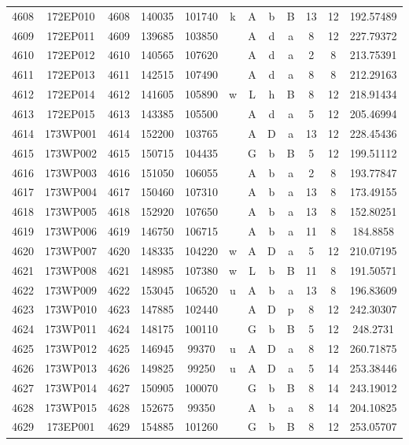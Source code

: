 \begin{tabular}{|*{12}{c|}}
4608 & 172EP010 & 4608 & 140035 & 101740 & k & A & b & B & 13 & 12 & 192.57489 \\ 
4609 & 172EP011 & 4609 & 139685 & 103850 &  & A & d & a & 8 & 12 & 227.79372 \\ 
4610 & 172EP012 & 4610 & 140565 & 107620 &  & A & d & a & 2 & 8 & 213.75391 \\ 
4611 & 172EP013 & 4611 & 142515 & 107490 &  & A & d & a & 8 & 8 & 212.29163 \\ 
4612 & 172EP014 & 4612 & 141605 & 105890 & w & L & h & B & 8 & 12 & 218.91434 \\ 
4613 & 172EP015 & 4613 & 143385 & 105500 &  & A & d & a & 5 & 12 & 205.46994 \\ 
4614 & 173WP001 & 4614 & 152200 & 103765 &  & A & D & a & 13 & 12 & 228.45436 \\ 
4615 & 173WP002 & 4615 & 150715 & 104435 &  & G & b & B & 5 & 12 & 199.51112 \\ 
4616 & 173WP003 & 4616 & 151050 & 106055 &  & A & b & a & 2 & 8 & 193.77847 \\ 
4617 & 173WP004 & 4617 & 150460 & 107310 &  & A & b & a & 13 & 8 & 173.49155 \\ 
4618 & 173WP005 & 4618 & 152920 & 107650 &  & A & b & a & 13 & 8 & 152.80251 \\ 
4619 & 173WP006 & 4619 & 146750 & 106715 &  & A & b & a & 11 & 8 & 184.8858 \\ 
4620 & 173WP007 & 4620 & 148335 & 104220 & w & A & D & a & 5 & 12 & 210.07195 \\ 
4621 & 173WP008 & 4621 & 148985 & 107380 & w & L & b & B & 11 & 8 & 191.50571 \\ 
4622 & 173WP009 & 4622 & 153045 & 106520 & u & A & b & a & 13 & 8 & 196.83609 \\ 
4623 & 173WP010 & 4623 & 147885 & 102440 &  & A & D & p & 8 & 12 & 242.30307 \\ 
4624 & 173WP011 & 4624 & 148175 & 100110 &  & G & b & B & 5 & 12 & 248.2731 \\ 
4625 & 173WP012 & 4625 & 146945 & 99370 & u & A & D & a & 8 & 12 & 260.71875 \\ 
4626 & 173WP013 & 4626 & 149825 & 99250 & u & A & D & a & 5 & 14 & 253.38446 \\ 
4627 & 173WP014 & 4627 & 150905 & 100070 &  & G & b & B & 8 & 14 & 243.19012 \\ 
4628 & 173WP015 & 4628 & 152675 & 99350 &  & A & b & a & 8 & 14 & 204.10825 \\ 
4629 & 173EP001 & 4629 & 154885 & 101260 &  & G & b & B & 8 & 12 & 253.05707 \\ 

\end{tabular}
